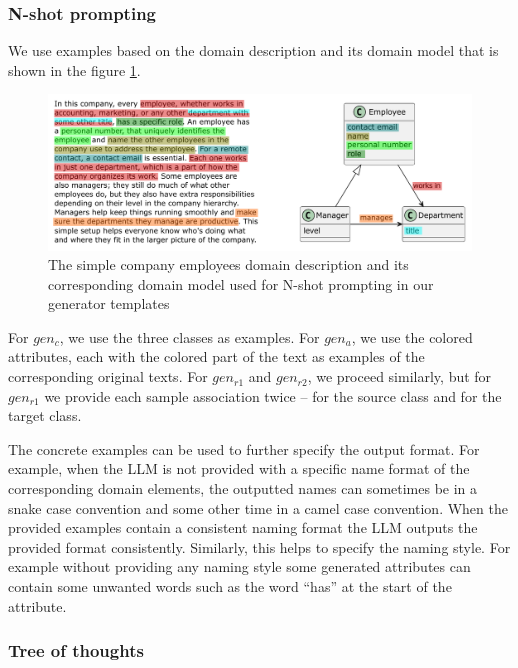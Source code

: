 \subsubsection{N-shot prompting}

We use examples based on the domain description and its domain model that is shown in the figure \ref{fig:prompting-domain}.

\begin{figure}[!h]
    \centering
    \includegraphics[scale=0.6]{img/prompting-domain.pdf}
    \caption{\centering The simple company employees domain description and its corresponding domain model used for N-shot prompting in our generator templates}
    \label{fig:prompting-domain}
\end{figure}


For $gen_c$, we use the three classes as examples. For $gen_a$, we use the colored attributes, each with the colored part of the text as examples of the corresponding original texts. For $gen_{r1}$ and ${gen_{r2}}$, we proceed similarly, but for ${gen_{r1}}$ we provide each sample association twice – for the source class and for the target class.

The concrete examples can be used to further specify the output format. For example,  when the LLM is not provided with a specific name format of the corresponding domain elements, the outputted names can sometimes be in a snake case convention and some other time in a camel case convention. When the provided examples contain a consistent naming format the LLM outputs the provided format consistently. Similarly, this helps to specify the naming style. For example without providing any naming style some generated attributes can contain some unwanted words such as the word ``has'' at the start of the attribute.


\subsubsection{Tree of thoughts}


